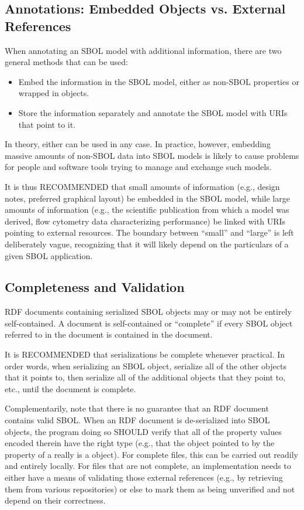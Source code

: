 \subsection{Annotations: Embedded Objects vs. External References}

When annotating an SBOL model with additional information, there are
two general methods that can be used:
\begin{itemize}
\item Embed the information in the SBOL model, either as non-SBOL
  properties or wrapped in  objects.
\item Store the information separately and annotate the SBOL model
  with URIs that point to it.
\end{itemize}

In theory, either can be used in any case.  In practice, however,
embedding massive amounts of non-SBOL data into SBOL models is likely
to cause problems for people and software tools trying to manage and
exchange such models.

It is thus RECOMMENDED that small amounts of information (e.g., design
notes, preferred graphical layout) be embedded in the SBOL model,
while large amounts of information (e.g., the scientific publication
from which a model was derived, flow cytometry data characterizing
performance) be linked with URIs pointing to external resources.
%
The boundary between ``small'' and ``large'' is left deliberately
vague, recognizing that it will likely depend on the particulars of a
given SBOL application.


\subsection{Completeness and Validation}

RDF documents containing serialized SBOL objects may or may not be
entirely self-contained.  A document is self-contained or ``complete''
if every SBOL object referred to in the document is contained in the
document.

It is RECOMMENDED that serializations be complete whenever practical.
In order words, when serializing an SBOL object, serialize all of the
other objects that it points to, then serialize all of the additional
objects that they point to, etc., until the document is complete.

Complementarily, note that there is no guarantee that an RDF document
contains valid SBOL. When an RDF document is de-serialized into SBOL
objects, the program doing so SHOULD verify that all of the property
values encoded therein have the right type (e.g., that the object
pointed to by the  property of a
 really is a  object).
%
For complete files, this can be carried out readily and entirely
locally.  For files that are not complete, an implementation needs to
either have a means of validating those external references (e.g., by
retrieving them from various repositories) or else to mark them as
being unverified and not depend on their correctness.

